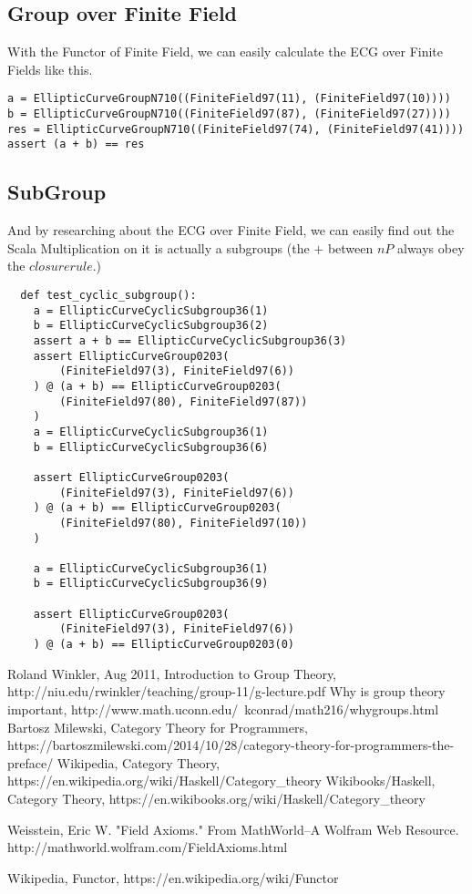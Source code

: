 \documentclass{article}
\begin{document}
  \subsection{Group over Finite Field}

  With the Functor of Finite Field, we can easily calculate the ECG over Finite Fields like this.

\begin{lstlisting}
a = EllipticCurveGroupN710((FiniteField97(11), (FiniteField97(10))))
b = EllipticCurveGroupN710((FiniteField97(87), (FiniteField97(27))))
res = EllipticCurveGroupN710((FiniteField97(74), (FiniteField97(41))))
assert (a + b) == res
\end{lstlisting}
\subsection{SubGroup}

And by researching about the ECG over Finite Field, we can easily find out the Scala Multiplication on it is actually a subgroups (the $+$ between $nP$ always obey the $closure rule.$)


\begin{lstlisting}
  def test_cyclic_subgroup():
    a = EllipticCurveCyclicSubgroup36(1)
    b = EllipticCurveCyclicSubgroup36(2)
    assert a + b == EllipticCurveCyclicSubgroup36(3)
    assert EllipticCurveGroup0203(
        (FiniteField97(3), FiniteField97(6))
    ) @ (a + b) == EllipticCurveGroup0203(
        (FiniteField97(80), FiniteField97(87))
    )
    a = EllipticCurveCyclicSubgroup36(1)
    b = EllipticCurveCyclicSubgroup36(6)

    assert EllipticCurveGroup0203(
        (FiniteField97(3), FiniteField97(6))
    ) @ (a + b) == EllipticCurveGroup0203(
        (FiniteField97(80), FiniteField97(10))
    )

    a = EllipticCurveCyclicSubgroup36(1)
    b = EllipticCurveCyclicSubgroup36(9)

    assert EllipticCurveGroup0203(
        (FiniteField97(3), FiniteField97(6))
    ) @ (a + b) == EllipticCurveGroup0203(0)

\end{lstlisting}        

\begin{thebibliography}{9}
 Roland Winkler, Aug 2011, Introduction to Group Theory, http://niu.edu/rwinkler/teaching/group-11/g-lecture.pdf
  Why is group theory important, http://www.math.uconn.edu/~kconrad/math216/whygroups.html
  Bartosz Milewski, Category Theory for Programmers, https://bartoszmilewski.com/2014/10/28/category-theory-for-programmers-the-preface/
  Wikipedia, Category Theory, https://en.wikipedia.org/wiki/Haskell/Category\_theory
  Wikibooks/Haskell, Category Theory, https://en.wikibooks.org/wiki/Haskell/Category\_theory

  Weisstein, Eric W. "Field Axioms." From MathWorld--A Wolfram Web Resource. http://mathworld.wolfram.com/FieldAxioms.html

  Wikipedia, Functor, https://en.wikipedia.org/wiki/Functor

\end{thebibliography}
\end{document}
